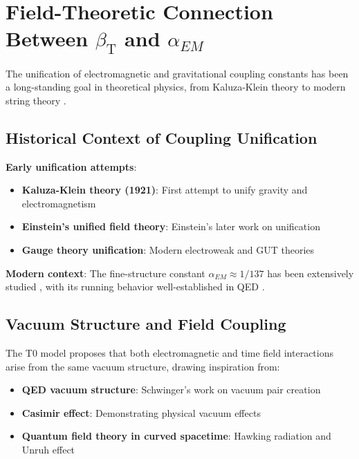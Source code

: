 \documentclass[12pt,a4paper]{article}
\newcommand{\betaT}{\beta_{\text{T}}}
\begin{document}
	\section{Field-Theoretic Connection Between $\betaT$ and $\alpha_{EM}$}
	\label{sec:beta_alpha_connection}
	
	The unification of electromagnetic and gravitational coupling constants has been a long-standing goal in theoretical physics, from Kaluza-Klein theory \citep{kaluza1921,klein1926} to modern string theory \citep{green1987,polchinski1998}.
	
	\subsection{Historical Context of Coupling Unification}
	\label{subsec:coupling_unification_history}
	
	\textbf{Early unification attempts}:
	\begin{itemize}
		\item \textbf{Kaluza-Klein theory (1921)}: First attempt to unify gravity and electromagnetism \citep{kaluza1921,klein1926}
		\item \textbf{Einstein's unified field theory}: Einstein's later work on unification \citep{einstein1955}
		\item \textbf{Gauge theory unification}: Modern electroweak \citep{weinberg1967,salam1968} and GUT theories \citep{georgi1974}
	\end{itemize}
	
	\textbf{Modern context}:
	The fine-structure constant $\alpha_{EM} \approx 1/137$ has been extensively studied \citep{sommerfeld1916,feynman1985}, with its running behavior well-established in QED \citep{peskin1995}.
	
	\subsection{Vacuum Structure and Field Coupling}
	\label{subsec:vacuum_structure}
	
	The T0 model proposes that both electromagnetic and time field interactions arise from the same vacuum structure, drawing inspiration from:
	\begin{itemize}
		\item \textbf{QED vacuum structure}: Schwinger's work on vacuum pair creation \citep{schwinger1951}
		\item \textbf{Casimir effect}: Demonstrating physical vacuum effects \citep{casimir1948}
		\item \textbf{Quantum field theory in curved spacetime}: Hawking radiation \citep{hawking1975} and Unruh effect \citep{unruh1976}
	\end{itemize}
	
\end{document}
